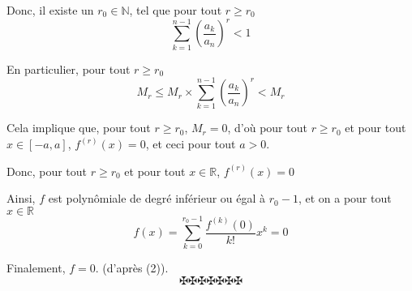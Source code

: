 Donc, il existe un $r_0 \in \mathbb{N}$, tel que pour tout $r \geq r_0$
\[ \sum_{k = 1}^{n - 1} \left( \frac{a_k}{a_n} \right)^r < 1 \]


En particulier, pour tout $r \geq r_0$
\[ M_r \leqslant M_r \times \sum_{k = 1}^{n - 1} \left( \frac{a_k}{a_n}
   \right)^r < M_r \]


Cela implique que, pour tout $r \geq r_0$, $M_r = 0$, d'o{\`u} pour tout $r
\geq r_0$ et pour tout $x \in [- a, a]$, $f^{(r)} (x) = 0$, et ceci pour tout
$a > 0$.

Donc, pour tout $r \geq r_0$ et pour tout $x \in \mathbb{R}$, $f^{(r)} (x) =
0$

Ainsi, $f$ est polyn{\^o}miale de degr{\'e} inf{\'e}rieur ou {\'e}gal {\`a}
$r_0 - 1$, et on a pour tout $x \in \mathbb{R}$
\[ f (x) = \sum_{k = 0}^{r_0 - 1} \frac{f^{(k)} (0)}{k!} x^k = 0 \]


Finalement, $f = 0$. (d'apr{\`e}s (2)).
\[ \maltese \maltese \maltese \maltese \maltese \maltese \maltese \]
